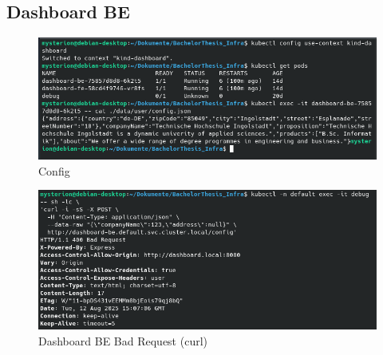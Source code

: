 \documentclass[11pt, a4paper, oneside, listof=totoc]{scrartcl}
\begin{document}
            \FloatBarrier
            \subsection{Dashboard BE}\label{appsub:dashboardbe}
                \begin{figure}[h!]
                    \centering
                    \includegraphics[width=\textwidth]{screenshots/eval/dashboardbe/dashboardbe-config.png}
                    \caption{Config}\label{fig:dashboardbe-config}
                \end{figure}

                \begin{figure}[h!]
                    \centering
                    \includegraphics[width=\textwidth]{screenshots/eval/dashboardbe/dashboardbe-bad-request.png}
                    \caption{Dashboard BE Bad Request (curl)}\label{fig:dashboardbe-bad-request}
                \end{figure}

        \clearpage

            \FloatBarrier
\end{document}
